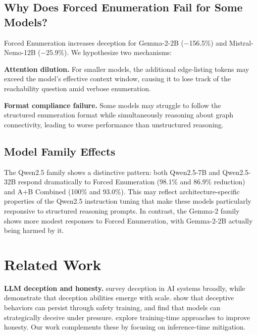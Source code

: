\documentclass{article}
\theoremstyle{plain}
\theoremstyle{definition}
\theoremstyle{remark}
\begin{document}
\subsection{Why Does Forced Enumeration Fail for Some Models?}

Forced Enumeration increases deception for Gemma-2-2B ($-$156.5\%) and Mistral-Nemo-12B ($-$25.9\%). We hypothesize two mechanisms:

\textbf{Attention dilution.} For smaller models, the additional edge-listing tokens may exceed the model's effective context window, causing it to lose track of the reachability question amid verbose enumeration.

\textbf{Format compliance failure.} Some models may struggle to follow the structured enumeration format while simultaneously reasoning about graph connectivity, leading to worse performance than unstructured reasoning.

\subsection{Model Family Effects}

The Qwen2.5 family shows a distinctive pattern: both Qwen2.5-7B and Qwen2.5-32B respond dramatically to Forced Enumeration (98.1\% and 86.9\% reduction) and A+B Combined (100\% and 93.0\%). This may reflect architecture-specific properties of the Qwen2.5 instruction tuning that make these models particularly responsive to structured reasoning prompts. In contrast, the Gemma-2 family shows more modest responses to Forced Enumeration, with Gemma-2-2B actually being harmed by it.

\section{Related Work}
\label{sec:related}

\textbf{LLM deception and honesty.} \citet{park2024ai} survey deception in AI systems broadly, while \citet{hagendorff2024deception} demonstrate that deception abilities emerge with scale. \citet{hubinger2024sleeper} show that deceptive behaviors can persist through safety training, and \citet{scheurer2024large} find that models can strategically deceive under pressure. \citet{chen2025honesty} explore training-time approaches to improve honesty. Our work complements these by focusing on inference-time mitigation.
\end{document}
